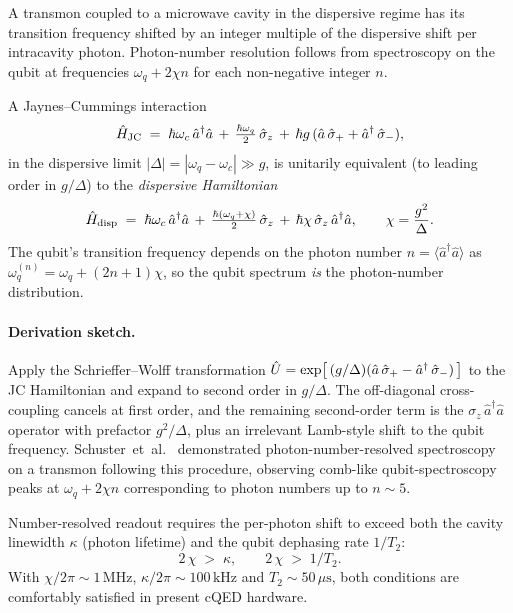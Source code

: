 \begin{phenomenon}
A transmon coupled to a microwave cavity in the dispersive regime
has its transition frequency shifted by an integer multiple of
the dispersive shift per intracavity photon. Photon-number
resolution follows from spectroscopy on the qubit at frequencies
$\omega_q + 2\chi n$ for each non-negative integer $n$.
\end{phenomenon}

\begin{statement}
\label{stmt:disp-H-smpd}
A Jaynes--Cummings interaction
\begin{equation}
\hat{H}_{\rm JC} \;=\; \hbar\omega_c\,\hat a^\dagger\hat a
\,+\, \tfrac{\hbar\omega_q}{2}\,\hat\sigma_z
\,+\, \hbar g\,(\hat a\,\hat\sigma_+ + \hat a^\dagger\,\hat\sigma_-),
\end{equation}
in the dispersive limit $|\Delta|=|\omega_q-\omega_c|\gg g$, is
unitarily equivalent (to leading order in $g/\Delta$) to the
\emph{dispersive Hamiltonian}
\begin{equation}
\label{eq:disp-H-smpd}
\hat{H}_{\rm disp} \;=\; \hbar\omega_c\,\hat a^\dagger\hat a
\,+\, \tfrac{\hbar(\omega_q+\chi)}{2}\,\hat\sigma_z
\,+\, \hbar\chi\,\hat\sigma_z\,\hat a^\dagger\hat a,
\qquad \chi=\frac{g^2}{\Delta}.
\end{equation}
The qubit's transition frequency depends on the photon number
$n=\langle\hat a^\dagger\hat a\rangle$ as
$\omega_q^{(n)}=\omega_q+(2n+1)\chi$, so the qubit spectrum
\emph{is} the photon-number distribution.
\end{statement}

\paragraph{Derivation sketch.}
Apply the Schrieffer--Wolff transformation
$\hat{U}=\exp[\,(g/\Delta)(\hat a\,\hat\sigma_+ - \hat a^\dagger\,\hat\sigma_-)\,]$
to the JC Hamiltonian and expand to second order in $g/\Delta$.
The off-diagonal cross-coupling cancels at first order, and the
remaining second-order term is the $\sigma_z\,\hat a^\dagger\hat a$
operator with prefactor $g^2/\Delta$, plus an irrelevant Lamb-style
shift to the qubit frequency. Schuster~et~al.~\cite{schuster2007}
demonstrated photon-number-resolved spectroscopy on a transmon
following this procedure, observing comb-like qubit-spectroscopy
peaks at $\omega_q + 2\chi n$ corresponding to photon numbers up
to $n\sim 5$.

\begin{statement}
\label{stmt:disp-resolution}
Number-resolved readout requires the per-photon shift to exceed
both the cavity linewidth $\kappa$ (photon lifetime) and the
qubit dephasing rate $1/T_2$:
\begin{equation}
\label{eq:photon-resolution}
2\,\chi \;>\; \kappa,\qquad
2\,\chi \;>\; 1/T_2.
\end{equation}
With $\chi/2\pi\sim 1\,\text{MHz}$, $\kappa/2\pi\sim 100\,\text{kHz}$
and $T_2\sim 50\,\mu\text{s}$, both conditions are comfortably
satisfied in present cQED hardware.
\end{statement}

